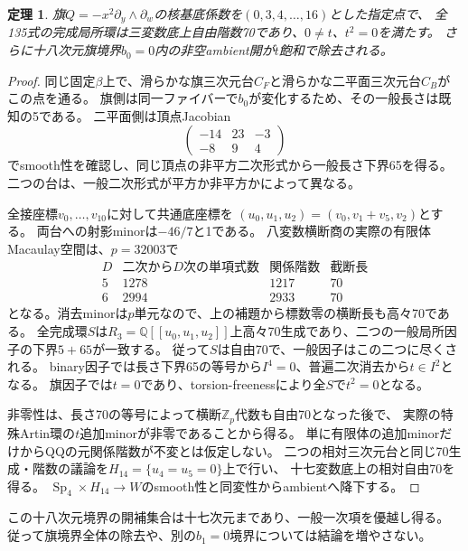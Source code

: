 \documentclass[11pt,a4paper]{ltjsarticle}
\DeclareMathOperator{\Sp}{Sp}
\newtheorem{theorem}{定理}[section]
\theoremstyle{remark}
\begin{document}
\newpage
\begin{theorem}
旗$Q=-x^2\partial_y\wedge\partial_w$の核基底係数を$(0,3,4,\ldots,16)$とした指定点で、
全135式の完成局所環は三変数底上自由階数70であり、$0\ne t$、$t^2=0$を満たす。
さらに十八次元旗境界$b_0=0$内の非空ambient開が$t$飽和で除去される。
\end{theorem}
\begin{proof}
同じ固定$\beta$上で、滑らかな旗三次元台$C_F$と滑らかな二平面三次元台$C_B$がこの点を通る。
旗側は同一ファイバーで$b_0$が変化するため、その一般長さは既知の5である。
二平面側は頂点Jacobian
\[
 \begin{pmatrix}-14&23&-3\\-8&9&4\end{pmatrix}
\]
でsmooth性を確認し、同じ頂点の非平方二次形式から一般長さ下界65を得る。
二つの台は、一般二次形式が平方か非平方かによって異なる。

全接座標$v_0,\ldots,v_{10}$に対して共通底座標を
$(u_0,u_1,u_2)=(v_0,v_1+v_5,v_2)$とする。
両台への射影minorは$-46/7$と1である。
八変数横断商の実際の有限体Macaulay空間は、$p=32003$で
\[
 \begin{array}{c|c|c|c}
 D&\text{二次から}D\text{次の単項式数}&\text{関係階数}&\text{截断長}\\\hline
 5&1278&1217&70\\
 6&2994&2933&70
 \end{array}
\]
となる。消去minorは$p$単元なので、上の補題から標数零の横断長も高々70である。
全完成環$S$は$R_3=\mathbb Q[[u_0,u_1,u_2]]$上高々70生成であり、二つの一般局所因子の下界$5+65$が一致する。
従って$S$は自由70で、一般因子はこの二つに尽くされる。
binary因子では長さ下界65の等号から$I^4=0$、普遍二次消去から$t\in I^2$となる。
旗因子では$t=0$であり、torsion-freenessにより全$S$で$t^2=0$となる。

非零性は、長さ70の等号によって横断$\mathbb Z_p$代数も自由70となった後で、
実際の特殊Artin環の$t$追加minorが非零であることから得る。
単に有限体の追加minorだけからQQの元関係階数が不変とは仮定しない。
二つの相対三次元台と同じ70生成・階数の議論を$H_{14}=\{u_4=u_5=0\}$上で行い、
十七変数底上の相対自由70を得る。
$\Sp_4\times H_{14}\to W$のsmooth性と同変性からambientへ降下する\cite{flag-binary-v41}。
\end{proof}
この十八次元境界の開補集合は十七次元まであり、一般一次項を優越し得る。
従って旗境界全体の除去や、別の$b_1=0$境界については結論を増やさない。
\end{document}
